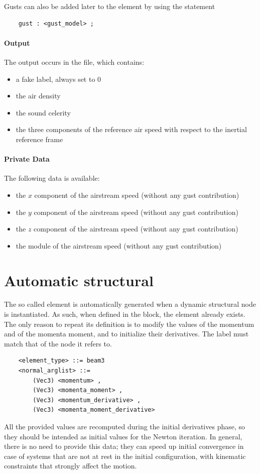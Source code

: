 Gusts can also be added later to the  element
by using the statement
\begin{verbatim}
    gust : <gust_model> ;
\end{verbatim}

\paragraph{Output}
The output occurs in the  file, which contains:
\begin{itemize}
\item a fake label, always set to 0
\item the air density
\item the sound celerity
\item the three components of the reference air speed
with respect to the inertial reference frame
\end{itemize}


\paragraph{Private Data}
The following data is available:
\begin{itemize}
\item {} the $x$ component of the airstream speed (without any gust contribution)
\item {} the $y$ component of the airstream speed (without any gust contribution)
\item {} the $z$ component of the airstream speed (without any gust contribution)
\item {} the module of the airstream speed (without any gust contribution)
\end{itemize}

\section{Automatic structural}
The so called  element is automatically generated
when a dynamic structural node is instantiated.
As such, when defined in the  block,
the element already exists.
The only reason to repeat its definition is to modify the values
of the momentum and of the momenta moment, and to initialize
their derivatives.
The label must match that of the node it refers to.
\begin{verbatim}
    <element_type> ::= beam3
    <normal_arglist> ::=
        (Vec3) <momentum> ,
        (Vec3) <momenta_moment> ,
        (Vec3) <momentum_derivative> ,
        (Vec3) <momenta_moment_derivative>
\end{verbatim}
All the provided values are recomputed during the initial derivatives phase,
so they should be intended as initial values for the Newton iteration.
In general, there is no need to provide this data; they can speed up
initial convergence in case of systems that are not at rest in the initial
configuration, with kinematic constraints that strongly affect
the motion.

